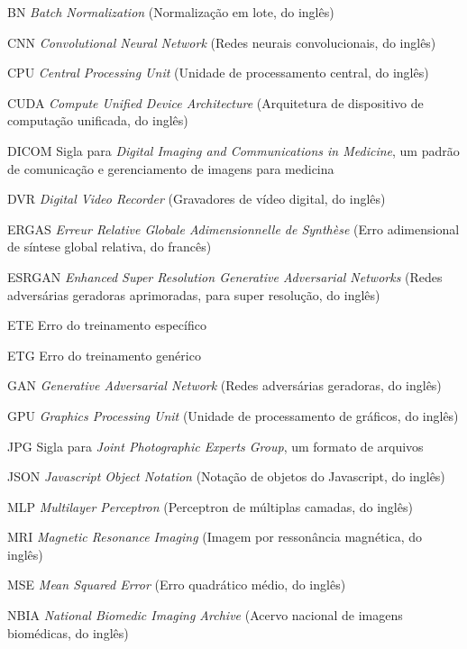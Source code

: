 \begin{siglas}
    \item[BN]       \textit{Batch Normalization} (Normalização em lote, do inglês)
    \item[CNN]      \textit{Convolutional Neural Network} (Redes neurais convolucionais, do inglês)
    \item[CPU]      \textit{Central Processing Unit} (Unidade de processamento central, do inglês) 
    \item[CUDA]     \textit{Compute Unified Device Architecture} (Arquitetura de dispositivo de computação unificada, do inglês)
    \item[DICOM]    Sigla para \textit{Digital Imaging and Communications in Medicine}, um padrão de comunicação e gerenciamento de imagens para medicina
    \item[DVR]      \textit{Digital Video Recorder} (Gravadores de vídeo digital, do inglês)
    \item[ERGAS]    \textit{Erreur Relative Globale Adimensionnelle de Synthèse} (Erro adimensional de síntese global relativa, do francês)
    \item[ESRGAN]   \textit{Enhanced Super Resolution Generative Adversarial Networks} (Redes adversárias geradoras aprimoradas, para super resolução, do inglês)
    \item[ETE]      Erro do treinamento específico
    \item[ETG]      Erro do treinamento genérico
    \item[GAN]      \textit{Generative Adversarial Network} (Redes adversárias geradoras, do inglês)
    \item[GPU]      \textit{Graphics Processing Unit} (Unidade de processamento de gráficos, do inglês)
    \item[JPG]      Sigla para \textit{Joint Photographic Experts Group}, um formato de arquivos
    \item[JSON]     \textit{Javascript Object Notation} (Notação de objetos do Javascript, do inglês)
    \item[MLP]      \textit{Multilayer Perceptron} (Perceptron de múltiplas camadas, do inglês)
    \item[MRI]      \textit{Magnetic Resonance Imaging} (Imagem por ressonância magnética, do inglês)
    \item[MSE]      \textit{Mean Squared Error} (Erro quadrático médio, do inglês)
    \item[NBIA]     \textit{National Biomedic Imaging Archive} (Acervo nacional de imagens biomédicas, do inglês)

\end{siglas}
